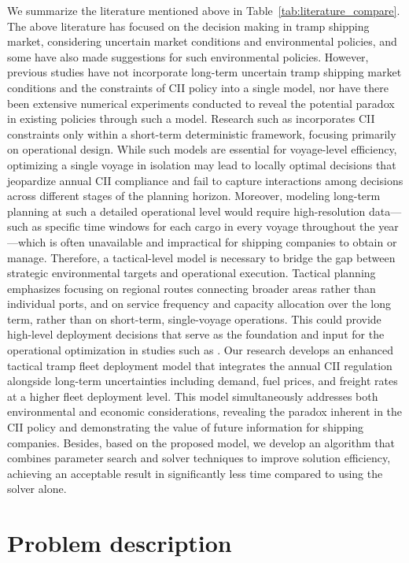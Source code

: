 \documentclass[11pt,english]{article}
\begin{document}
We summarize the literature mentioned above in Table~\ref{tab:literature_compare}. The above literature has focused on the decision making in tramp shipping market, considering uncertain market conditions and environmental policies, and some have also made suggestions for such environmental policies. However, previous studies have not incorporate long-term uncertain tramp shipping market conditions and the constraints of CII policy into a single model, nor have there been extensive numerical experiments conducted to reveal the potential paradox in existing policies through such a model. Research such as \cite{cheng2025cargo} incorporates CII constraints only within a short-term deterministic framework, focusing primarily on operational design. While such models are essential for voyage-level efficiency, optimizing a single voyage in isolation may lead to locally optimal decisions that jeopardize annual CII compliance and fail to capture interactions among decisions across different stages of the planning horizon. Moreover, modeling long-term planning at such a detailed operational level would require high-resolution data—such as specific time windows for each cargo in every voyage throughout the year—which is often unavailable and impractical for shipping companies to obtain or manage. Therefore, a tactical-level model is necessary to bridge the gap between strategic environmental targets and operational execution. Tactical planning emphasizes focusing on regional routes connecting broader areas rather than individual ports, and on service frequency and capacity allocation over the long term, rather than on short-term, single-voyage operations. This could provide high-level deployment decisions that serve as the foundation and input for the operational optimization in studies such as \cite{cheng2025cargo}. Our research develops an enhanced tactical tramp fleet deployment model that integrates the annual CII regulation alongside long-term uncertainties including demand, fuel prices, and freight rates at a higher fleet deployment level. This model simultaneously addresses both environmental and economic considerations, revealing the paradox inherent in the CII policy and demonstrating the value of future information for shipping companies. Besides, based on the proposed model, we develop an algorithm that combines parameter search and solver techniques to improve solution efficiency, achieving an acceptable result in significantly less time compared to using the solver alone.

\section{Problem description}
\label{sec:problem_description}
\end{document}
